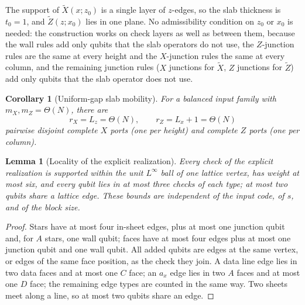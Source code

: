 \documentclass[aps,prx,reprint,superscriptaddress,nofootinbib,floatfix,longbibliography]{revtex4-2}
\newtheorem{lemma}[theorem]{Lemma}
\newtheorem{corollary}[theorem]{Corollary}
\theoremstyle{definition}
\begin{document}
The support of $\widetilde X(x;z_0)$ is a single layer of $z$-edges, so the
slab thickness is $t_0=1$, and $\widetilde Z(z;x_0)$ lies in one plane.  No
admissibility condition on $z_0$ or $x_0$ is needed: the construction works
on check layers as well as between them, because the wall rules add only
qubits that the slab operators do not use, the $Z$-junction rules are the same
at every height and the $X$-junction rules the same at every column, and the
remaining junction rules ($X$ junctions for $\widetilde X$, $Z$ junctions for
$\widetilde Z$) add only qubits that the slab operator does not use.

\begin{corollary}[Uniform-gap slab mobility]
\label{cor:uniform-gap-slabs}
For a balanced input family with $m_X,m_Z=\Theta(N)$, there are
\begin{equation}
 r_X=L_z=\Theta(N),\qquad r_Z=L_x+1=\Theta(N)
 \label{eq:many-slabs-count}
\end{equation}
pairwise disjoint complete $X$ ports (one per height) and complete $Z$ ports
(one per column).
\end{corollary}

\begin{lemma}[Locality of the explicit realization]
\label{lem:wb-cell-locality}
Every check of the explicit realization is supported within the unit
$L^\infty$ ball of one lattice vertex, has weight at most six, and every qubit lies in at most three checks
of each type; at most two qubits share a lattice edge.  These bounds are
independent of the input code, of $s$, and of the block size.
\end{lemma}
\begin{proof}
Stars have at most four in-sheet edges, plus at most one junction qubit and,
for $A$ stars, one wall qubit; faces have at most four edges plus at most one
junction qubit and one wall qubit.  All added qubits are edges at the same vertex, or edges of the same face
position, as the check they join.  A
data line edge lies in two data faces and at most one $C$ face; an $a_x$ edge
lies in two $A$ faces and at most one $D$ face; the remaining edge types are
counted in the same way.  Two sheets meet along a line, so at most two qubits
share an edge.
\end{proof}
\end{document}
